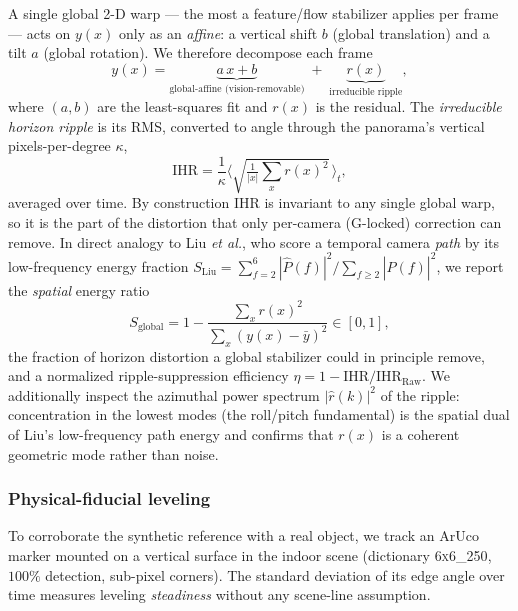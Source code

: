 \documentclass[journal]{IEEEtran}
\newcommand{\etal}{\textit{et al.}}
\begin{document}
A single global 2-D warp --- the most a feature/flow stabilizer applies per frame --- acts on $y(x)$ only as an \emph{affine}: a vertical shift $b$ (global translation) and a tilt $a$ (global rotation). We therefore decompose each frame
\begin{equation}
y(x) = \underbrace{a\,x + b}_{\text{global-affine (vision-removable)}} \;+\; \underbrace{r(x)}_{\text{irreducible ripple}},
\label{eq:ripple_decomp}
\end{equation}
where $(a,b)$ are the least-squares fit and $r(x)$ is the residual. The \emph{irreducible horizon ripple} is its RMS, converted to angle through the panorama's vertical pixels-per-degree $\kappa$,
\begin{equation}
\mathrm{IHR} = \frac{1}{\kappa}\Big\langle \sqrt{\tfrac{1}{|x|}\textstyle\sum_x r(x)^2}\,\Big\rangle_t ,
\label{eq:ihr}
\end{equation}
averaged over time. By construction $\mathrm{IHR}$ is invariant to any single global warp, so it is the part of the distortion that only per-camera (G-locked) correction can remove. In direct analogy to Liu \etal, who score a temporal camera \emph{path} by its low-frequency energy fraction $S_{\mathrm{Liu}}=\sum_{f=2}^{6}|\hat P(f)|^2/\sum_{f\ge2}|\hat P(f)|^2$, we report the \emph{spatial} energy ratio
\begin{equation}
S_{\mathrm{global}} = 1 - \frac{\sum_x r(x)^2}{\sum_x (y(x)-\bar y)^2}\in[0,1],
\label{eq:sglobal}
\end{equation}
the fraction of horizon distortion a global stabilizer could in principle remove, and a normalized ripple-suppression efficiency $\eta = 1-\mathrm{IHR}/\mathrm{IHR}_{\mathrm{Raw}}$. We additionally inspect the azimuthal power spectrum $|\hat r(k)|^2$ of the ripple: concentration in the lowest modes (the roll/pitch fundamental) is the spatial dual of Liu's low-frequency path energy and confirms that $r(x)$ is a coherent geometric mode rather than noise.

\subsubsection{Physical-fiducial leveling}
To corroborate the synthetic reference with a real object, we track an ArUco marker \cite{garrido2014aruco} mounted on a vertical surface in the indoor scene (dictionary \textsc{6x6\_250}, $100\%$ detection, sub-pixel corners). The standard deviation of its edge angle over time measures leveling \emph{steadiness} without any scene-line assumption.
\end{document}
